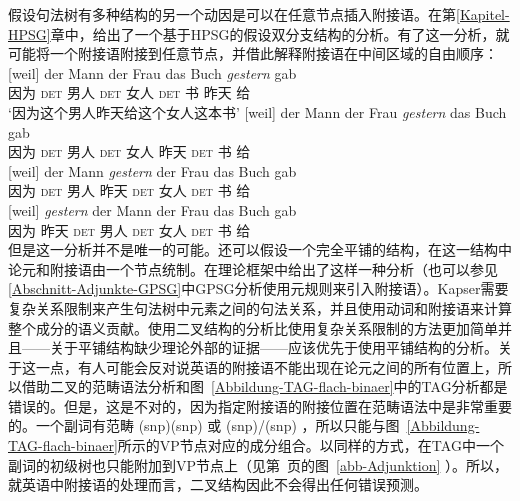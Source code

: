 假设句法树有多种结构的另一个动因是可以在任意节点插入附接语。在第\ref{Kapitel-HPSG}章中，给出了一个基于HPSG的假设双分支结构的分析。有了这一分析，就可能将一个附接语附接到任意节点，并借此解释附接语在中间区域的自由顺序：
\eal
\ex 
\gll {}[weil] der Mann der Frau das Buch \emph{gestern} gab\\
	 {}\spacebr{}因为 \textsc{det} 男人 \textsc{det} 女人 \textsc{det} 书 昨天 给\\
\glt `因为这个男人昨天给这个女人这本书'	 
\ex 
\gll {}[weil] der Mann der Frau \emph{gestern} das Buch gab\\
	 {}\spacebr{}因为 \textsc{det} 男人 \textsc{det} 女人 昨天 \textsc{det} 书 给\\
\ex 
\gll {}[weil] der Mann \emph{gestern} der Frau das Buch gab\\
	 {}\spacebr{}因为 \textsc{det} 男人 昨天 \textsc{det} 女人 \textsc{det} 书 给\\
\ex 
\gll {}[weil] \emph{gestern} der Mann der Frau das Buch gab\\
	 {}\spacebr{}因为 昨天 \textsc{det} 男人 \textsc{det} 女人 \textsc{det} 书 给\\
\zl
但是这一分析并不是唯一的可能。还可以假设一个完全平铺的结构，在这一结构中论元和附接语由一个节点统制。\citet{Kasper94a}在\hpsgc 理论框架中给出了这样一种分析（也可以参见\ref{Abschnitt-Adjunkte-GPSG}中GPSG分析使用元规则来引入附接语）。Kapser需要复杂关系限制来产生句法树中元素之间的句法关系，并且使用动词和附接语来计算整个成分的语义贡献。使用二叉结构的分析比使用复杂关系限制的方法更加简单并且——关于平铺结构缺少理论外部的证据——应该优先于使用平铺结构的分析。关于这一点，有人可能会反对说英语的附接语不能出现在论元之间的所有位置上，所以借助二叉的范畴语法分析和图~\ref{Abbildung-TAG-flach-binaer}中的TAG分析都是错误的。但是，这是不对的，因为指定附接语的附接位置在范畴语法中是非常重要的。一个副词有范畴 (s\bs np)\bs (s\bs np) 或 (s\bs np)/(s\bs np) ，所以只能与图~\ref{Abbildung-TAG-flach-binaer}所示的VP节点对应的成分组合。以同样的方式，在TAG中一个副词的初级树也只能附加到VP节点上（见第~\pageref{abb-Adjunktion}页的图~\ref{abb-Adjunktion} ）。所以，就英语中附接语的处理而言，二叉结构因此不会得出任何错误预测。
